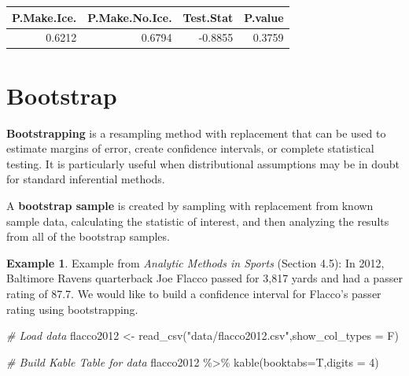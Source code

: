 \documentclass[
  11pt,
]{book}
\newenvironment{Shaded}{\begin{snugshade}}{\end{snugshade}}
\newcommand{\AttributeTok}[1]{\textcolor[rgb]{0.77,0.63,0.00}{#1}}
\newcommand{\CommentTok}[1]{\textcolor[rgb]{0.56,0.35,0.01}{\textit{#1}}}
\newcommand{\DecValTok}[1]{\textcolor[rgb]{0.00,0.00,0.81}{#1}}
\newcommand{\FunctionTok}[1]{\textcolor[rgb]{0.00,0.00,0.00}{#1}}
\newcommand{\NormalTok}[1]{#1}
\newcommand{\OtherTok}[1]{\textcolor[rgb]{0.56,0.35,0.01}{#1}}
\newcommand{\SpecialCharTok}[1]{\textcolor[rgb]{0.00,0.00,0.00}{#1}}
\newcommand{\StringTok}[1]{\textcolor[rgb]{0.31,0.60,0.02}{#1}}
\theoremstyle{definition}
\theoremstyle{definition}
\newtheorem{example}{Example}[chapter]
\theoremstyle{definition}
\theoremstyle{definition}
\theoremstyle{remark}
\begin{document}
\begin{tabular}{rrrr}
\toprule
P.Make.Ice. & P.Make.No.Ice. & Test.Stat & P.value\\
\midrule
0.6212 & 0.6794 & -0.8855 & 0.3759\\
\bottomrule
\end{tabular}

\newpage

\hypertarget{bootstrap}{%
\section{Bootstrap}\label{bootstrap}}

\textbf{Bootstrapping} is a resampling method with replacement that can be used to estimate margins of error, create confidence intervals, or complete statistical testing. It is particularly useful when distributional assumptions may be in doubt for standard inferential methods.

A \textbf{bootstrap sample} is created by sampling with replacement from known sample data, calculating the statistic of interest, and then analyzing the results from all of the bootstrap samples.

\begin{example}
Example from \emph{Analytic Methods in Sports} (Section 4.5): In 2012, Baltimore Ravens quarterback Joe Flacco passed for 3,817 yards and had a passer rating of 87.7. We would like to build a confidence interval for Flacco's passer rating using bootstrapping.
\end{example}

\begin{Shaded}
\begin{Highlighting}[]
\CommentTok{\# Load data}
\NormalTok{flacco2012 }\OtherTok{\textless{}{-}} \FunctionTok{read\_csv}\NormalTok{(}\StringTok{"data/flacco2012.csv"}\NormalTok{,}\AttributeTok{show\_col\_types =}\NormalTok{ F)}

\CommentTok{\# Build Kable Table for data}
\NormalTok{flacco2012  }\SpecialCharTok{\%\textgreater{}\%} 
  \FunctionTok{kable}\NormalTok{(}\AttributeTok{booktabs=}\NormalTok{T,}\AttributeTok{digits =} \DecValTok{4}\NormalTok{)}
\end{Highlighting}
\end{Shaded}
\end{document}

